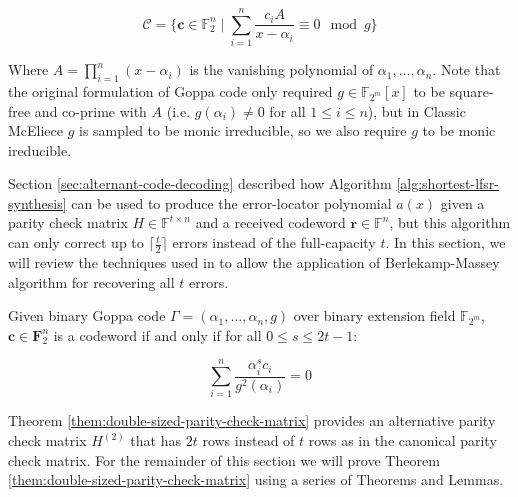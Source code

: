 \documentclass[runningheads]{llncs}
\begin{document}
\begin{equation*}
    \mathcal{C} = \{\mathbf{c}\in\mathbb{F}_2^n \mid \sum_{i=1}^n \frac{c_iA}{x - \alpha_i}\equiv 0 \mod g\}
\end{equation*}

Where $A = \prod_{i=1}^{n}(x - \alpha_i)$ is the vanishing polynomial of $\alpha_1, \ldots, \alpha_n$. Note that the original formulation of Goppa code only required $g\in\mathbb{F}_{2^m}[x]$ to be square-free and co-prime with $A$ (i.e. $g(\alpha_i)\neq 0$ for all $1 \leq i \leq n$), but in Classic McEliece $g$ is sampled to be monic irreducible, so we also require $g$ to be monic ireducible.

Section \ref{sec:alternant-code-decoding} described how Algorithm \ref{alg:shortest-lfsr-synthesis} can be used to produce the error-locator polynomial $a(x)$ given a parity check matrix $H \in \mathbb{F}^{t \times n}$ and a received codeword $\mathbf{r}\in\mathbb{F}^n$, but this algorithm can only correct up to $\lceil\frac{t}{2}\rceil$ errors instead of the full-capacity $t$. In this section, we will review the techniques used in \cite{DBLP:journals/jce/HeyseG13} to allow the application of Berlekamp-Massey algorithm for recovering all $t$ errors.

\begin{theorem}\label{them:double-sized-parity-check-matrix}
    Given binary Goppa code $\Gamma = (\alpha_1, \ldots, \alpha_n, g)$ over binary extension field $\mathbb{F}_{2^m}$, $\mathbf{c}\in\mathbf{F}_2^n$ is a codeword if and only if for all $0\leq s\leq 2t-1$:

    \begin{equation*}
        \sum_{i=1}^n \frac{\alpha_i^s c_i}{g^2(\alpha_i)} = 0
    \end{equation*}
\end{theorem}

Theorem \ref{them:double-sized-parity-check-matrix} provides an alternative parity check matrix $H^{(2)}$ that has $2t$ rows instead of $t$ rows as in the canonical parity check matrix. For the remainder of this section we will prove Theorem \ref{them:double-sized-parity-check-matrix} using a series of Theorems and Lemmas.
\end{document}
